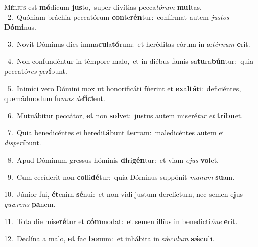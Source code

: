 \lettrine{\initial\textcolor{\initialcolor}{M}}{élius} est \textbf{mó}\-dicum \textbf{jus}\-to,~\star super divítias pecca\-\textit{tó}\-\textit{rum} \textbf{mul}\-tas.\\
{\numbfont\textcolor{\numbcolor}{~2.}}~Quóniam bráchia peccatórum \textbf{con}\-te\-\textbf{rén}\-tur:~\star confírmat autem \textit{jus}\-\textit{tos} \textbf{Dó}\-\textbf{mi}nus.\par
{\numbfont\textcolor{\numbcolor}{~3.}}~Novit Dóminus dies imma\-\textbf{cu}\-la\-\textbf{tó}\-rum:~\star et heréditas eórum in æ\-\textit{tér}\-\textit{num} \textbf{e}\-rit.\par
{\numbfont\textcolor{\numbcolor}{~4.}}~Non confundéntur in témpore malo,~\dagger et in diébus famis sa\-\textbf{tu}\-ra\-\textbf{bún}\-tur:~\star quia peccató\textit{res} \textit{per}\-\textbf{í}bunt.\par
{\numbfont\textcolor{\numbcolor}{~5.}}~Inimíci vero Dómini mox ut honorificáti fúerint et \textbf{ex}\-al\-\textbf{tá}\-ti:~\star deficiéntes, quemádmodum fu\textit{mus} \textit{de}\-\textbf{fí}\textbf{ci}ent.\par
{\numbfont\textcolor{\numbcolor}{~6.}}~Mutuábitur peccátor, \textbf{et} non \textbf{sol}\-vet:~\star justus autem miseré\textit{tur} \textit{et} \textbf{trí}\-\textbf{bu}et.\par
{\numbfont\textcolor{\numbcolor}{~7.}}~Quia benedicéntes ei heredi\-\textbf{tá}\-bunt \textbf{ter}\-ram:~\star maledicéntes autem ei \textit{dis}\-\textit{per}\textbf{í}bunt.\par
{\numbfont\textcolor{\numbcolor}{~8.}}~Apud Dóminum gressus hóminis \textbf{di}\-ri\-\textbf{gén}\-tur:~\star et viam \textit{e}\-\textit{jus} \textbf{vo}\-let.\par
{\numbfont\textcolor{\numbcolor}{~9.}}~Cum cecíderit non \textbf{col}\-li\-\textbf{dé}\-tur:~\star quia Dóminus suppónit \textit{ma}\-\textit{num} \textbf{su}\-am.\par
{\numbfont\textcolor{\numbcolor}{10.}}~Júnior fui, \textbf{ét}\-enim \textbf{sé}\-nui:~\star et non vidi justum derelíctum, nec semen ejus \textit{quæ}\-\textit{rens} \textbf{pa}\-nem.\par
{\numbfont\textcolor{\numbcolor}{11.}}~Tota die mise\-\textbf{ré}\-tur et \textbf{cóm}\-modat:~\star et semen illíus in benedicti\-\textit{ó}\-\textit{ne} \textbf{e}\-rit.\par
{\numbfont\textcolor{\numbcolor}{12.}}~Declína a malo, \textbf{et} fac \textbf{bo}\-num:~\star et inhábita in sǽ\-\textit{cu}\-\textit{lum} \textbf{sǽ}\-\textbf{cu}li.\par

